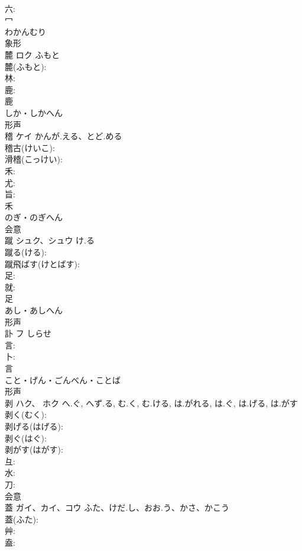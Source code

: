 \documentclass[8pt]{extreport}
\begin{document}
\begin{CJK}{UTF8}{min}
\\	六: 
\\	冖	
\\	わかんむり	
\\	象形 
\\	麓	ロク	ふもと		
\\	麓(ふもと): 
\\	林: 
\\	鹿: 
\\	鹿	
\\	しか・しかへん	
\\	形声 
\\	稽	ケイ	かんが.える、とど.める		
\\	稽古(けいこ): 
\\	滑稽(こっけい): 
\\	禾: 
\\	尤: 
\\	旨: 
\\	禾	
\\	のぎ・のぎへん	
\\	会意 
\\	蹴	シュク、シュウ	け.る		
\\	蹴る(ける): 
\\	蹴飛ばす(けとばす): 
\\	足: 
\\	就: 
\\	足	
\\	あし・あしへん	
\\	形声 
\\	訃	フ	しらせ		
\\	言: 
\\	卜: 
\\	言	
\\	こと・げん・ごんべん・ことば	
\\	形声 
\\	剥	ハク、 ホク	へ.ぐ, へず.る, む.く, む.ける, は.がれる, は.ぐ, は.げる, は.がす		
\\	剥く(むく): 
\\	剥げる(はげる): 
\\	剥ぐ(はぐ): 
\\	剥がす(はがす): 
\\	彑: 
\\	水: 
\\	刀: 
\\	会意 
\\	蓋	ガイ、カイ、コウ	ふた、けだ.し、おお.う、かさ、かこう		
\\	蓋(ふた): 
\\	艸: 
\\	盍: 

\end{CJK}
\end{document}
